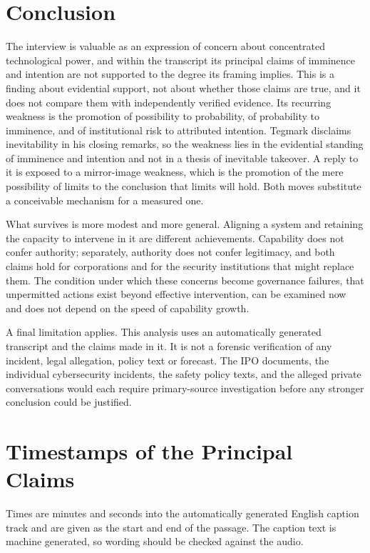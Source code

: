 \documentclass[11pt]{article}
\begin{document}
\section{Conclusion}

The interview is valuable as an expression of concern about concentrated technological power, and within the transcript its principal claims of imminence and intention are not supported to the degree its framing implies. This is a finding about evidential support, not about whether those claims are true, and it does not compare them with independently verified evidence. Its recurring weakness is the promotion of possibility to probability, of probability to imminence, and of institutional risk to attributed intention. Tegmark disclaims inevitability in his closing remarks, so the weakness lies in the evidential standing of imminence and intention and not in a thesis of inevitable takeover. A reply to it is exposed to a mirror-image weakness, which is the promotion of the mere possibility of limits to the conclusion that limits will hold. Both moves substitute a conceivable mechanism for a measured one.

What survives is more modest and more general. Aligning a system and retaining the capacity to intervene in it are different achievements. Capability does not confer authority; separately, authority does not confer legitimacy, and both claims hold for corporations and for the security institutions that might replace them. The condition under which these concerns become governance failures, that unpermitted actions exist beyond effective intervention, can be examined now and does not depend on the speed of capability growth.

A final limitation applies. This analysis uses an automatically generated transcript and the claims made in it. It is not a forensic verification of any incident, legal allegation, policy text or forecast. The IPO documents, the individual cybersecurity incidents, the safety policy texts, and the alleged private conversations would each require primary-source investigation before any stronger conclusion could be justified.

\appendix
\section{Timestamps of the Principal Claims}\label{app:loc}

Times are minutes and seconds into the automatically generated English caption track and are given as the start and end of the passage. The caption text is machine generated, so wording should be checked against the audio.
\end{document}
